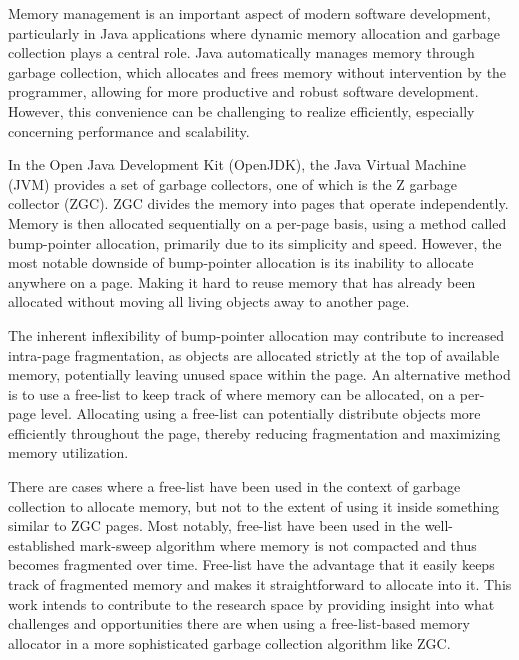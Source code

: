 
Memory management is an important aspect of modern software development, particularly in Java applications where dynamic memory allocation and garbage collection plays a central role. Java automatically manages memory through garbage collection, which allocates and frees memory without intervention by the programmer, allowing for more productive and robust software development. However, this convenience can be challenging to realize efficiently, especially concerning performance and scalability. 

In the Open Java Development Kit (OpenJDK), the Java Virtual Machine (JVM) provides a set of garbage collectors, one of which is the Z garbage collector (ZGC). ZGC divides the memory into pages that operate independently. Memory is then allocated sequentially on a per-page basis, using a method called bump-pointer allocation, primarily due to its simplicity and speed. However, the most notable downside of bump-pointer allocation is its inability to allocate anywhere on a page. Making it hard to reuse memory that has already been allocated without moving all living objects away to another page. 

The inherent inflexibility of bump-pointer allocation may contribute to increased intra-page fragmentation, as objects are allocated strictly at the top of available memory, potentially leaving unused space within the page. An alternative method is to use a free-list to keep track of where memory can be allocated, on a per-page level. Allocating using a free-list can potentially distribute objects more efficiently throughout the page, thereby reducing fragmentation and maximizing memory utilization.

There are cases where a free-list have been used in the context of garbage collection to allocate memory, but not to the extent of using it inside something similar to ZGC pages. Most notably, free-list have been used in the well-established mark-sweep algorithm where memory is not compacted and thus becomes fragmented over time. Free-list have the advantage that it easily keeps track of fragmented memory and makes it straightforward to allocate into it. This work intends to contribute to the research space by providing insight into what challenges and opportunities there are when using a free-list-based memory allocator in a more sophisticated garbage collection algorithm like ZGC.


